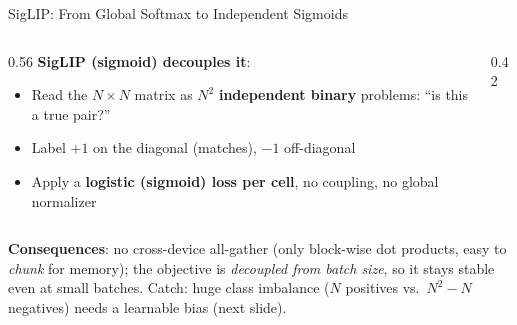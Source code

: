 \begin{frame}{SigLIP: From Global Softmax to Independent Sigmoids}
\begin{columns}
\begin{column}{0.56\textwidth}
      \vspace{0.3em}
      \textbf{SigLIP (sigmoid) decouples it}:
      \begin{itemize}
        \item Read the $N\times N$ matrix as $N^2$ \textbf{independent binary} problems: ``is this a true pair?''
        \item Label $+1$ on the diagonal (matches), $-1$ off-diagonal
        \item Apply a \textbf{logistic (sigmoid) loss per cell}, no coupling, no global normalizer
      \end{itemize}
    \end{column}
    \begin{column}{0.42\textwidth}
      \begin{center}
      \end{center}
    \end{column}
  \end{columns}

  \vspace{0.3em}
  \textbf{Consequences}: no cross-device all-gather (only block-wise dot products, easy to \emph{chunk} for memory); the objective is \emph{decoupled from batch size}, so it stays stable even at small batches. Catch: huge class imbalance ($N$ positives vs.\ $N^2{-}N$ negatives) needs a learnable bias (next slide).
\end{frame}

